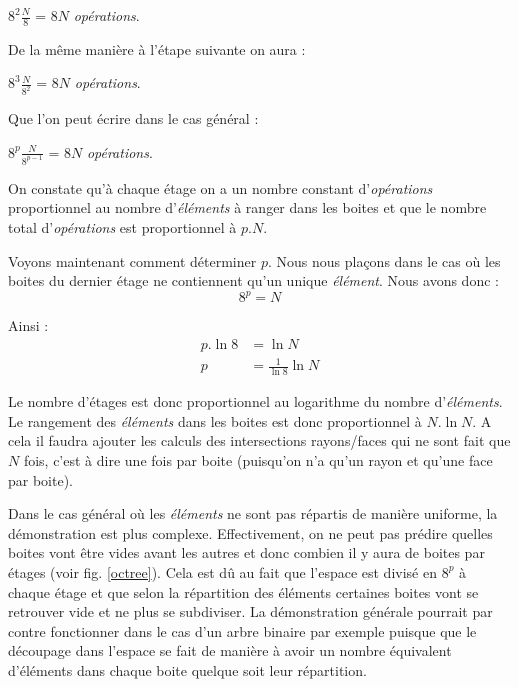 \begin{center}
$8^2\frac{N}{8}$ = $8N$ \textit{opérations}.
\end{center}

De la même manière à l'étape suivante on aura :
\begin{center}
$8^3\frac{N}{8^2}$ = $8N$ \textit{opérations}.
\end{center}

Que l'on peut écrire dans le cas général :
\begin{center}
$8^p\frac{N}{8^{p-1}}$ = $8N$ \textit{opérations}.
\end{center}

On constate qu'à chaque étage on a un nombre constant d'\textit{opérations} proportionnel au nombre d'\textit{éléments} à ranger dans les boites et que le nombre total d'\textit{opérations} est proportionnel à $p.N$.

Voyons maintenant comment déterminer $p$. Nous nous plaçons dans le cas où les boites du dernier étage ne contiennent qu'un unique \textit{élément}. Nous avons donc :
\begin{equation} \label{nbEtage}
8^p = N
\end{equation}

Ainsi :
\begin{align}
p.\ln{8} &= \ln{N} \\
p &= \frac{1}{\ln{8}}\ln{N}
\end{align}

Le nombre d'étages est donc proportionnel au logarithme du nombre d'\textit{éléments}. Le rangement des \textit{éléments} dans les boites est donc proportionnel à $N.\ln{N}$. A cela il faudra ajouter les calculs des intersections rayons/faces qui ne sont fait que $N$ fois, c'est à dire une fois par boite (puisqu'on n'a qu'un rayon et qu'une face par boite).

Dans le cas général où les \textit{éléments} ne sont pas répartis de manière uniforme, la démonstration est plus complexe. Effectivement, on ne peut pas prédire quelles boites vont être vides avant les autres et donc combien il y aura de boites par étages (voir fig. \ref{octree}). Cela est dû au fait que l'espace est divisé en $8^p$ à chaque étage et que selon la répartition des éléments certaines boites vont se retrouver vide et ne plus se subdiviser. La démonstration générale pourrait par contre fonctionner dans le cas d'un arbre binaire par exemple puisque que le découpage dans l'espace se fait de manière à avoir un nombre équivalent d'éléments dans chaque boite quelque soit leur répartition.

